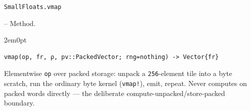 \par\medskip\noindent\begin{minipage}{\linewidth}
\hypertarget{7247813055970228015}{\texttt{SmallFloats.vmap}}  -- {Method.}
\nopagebreak
\begin{adjustwidth}{2em}{0pt}


\begin{verbatim}
vmap(op, fr, ρ, pv::PackedVector; rng=nothing) -> Vector{fr}
\end{verbatim}

Elementwise \texttt{op} over packed storage: unpack a \texttt{256}-element tile into a byte scratch, run the ordinary byte kernel (\texttt{vmap!}), emit, repeat. Never computes on packed words directly — the deliberate compute-unpacked/store-packed boundary.



\end{adjustwidth}
\end{minipage}
\par\medskip

